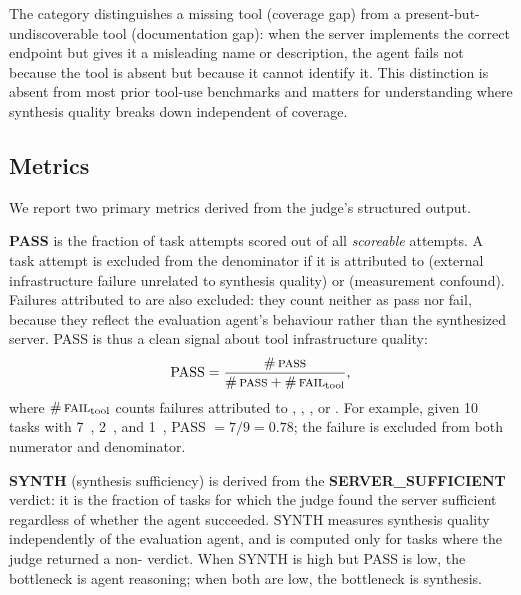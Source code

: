 \noindent
The  category distinguishes a missing tool (coverage gap) from a present-but-undiscoverable tool (documentation gap): when the server implements the correct endpoint but gives it a misleading name or description, the agent fails not because the tool is absent but because it cannot identify it. This distinction is absent from most prior tool-use benchmarks and matters for understanding where synthesis quality breaks down independent of coverage.

\subsection{Metrics}
\label{sec:metrics}

We report two primary metrics derived from the judge's structured output.

\textbf{PASS} is the fraction of task attempts scored  out of all \emph{scoreable} attempts. A task attempt is excluded from the denominator if it is attributed to  (external infrastructure failure unrelated to synthesis quality) or  (measurement
confound). Failures attributed to  are also excluded:
they count neither as pass nor fail, because they reflect the evaluation agent's behaviour rather than the synthesized server. PASS is thus a clean signal about tool infrastructure quality:
%
\begin{equation}
  \text{PASS}
  = \frac{\#\,\textsc{pass}}
    {\#\,\textsc{pass} + \#\,\textsc{fail}_{\text{tool}}},
  \label{eq:pass}
\end{equation}
%
where $\#\,\textsc{fail}_{\text{tool}}$ counts failures attributed to
, ,
, or .
For example, given 10 tasks with 7~, 2~,
and 1~, PASS $= 7/9 = 0.78$; the
 failure is excluded from both numerator and
denominator.

\textbf{SYNTH} (synthesis sufficiency) is derived from the \textbf{SERVER\_SUFFICIENT} verdict: it is the fraction of tasks for which the judge found the server sufficient regardless of whether the agent succeeded. SYNTH measures synthesis quality independently of the evaluation
agent, and is computed only for tasks where the judge returned a non- verdict. When SYNTH is high but PASS is low, the bottleneck is agent reasoning; when both are low, the bottleneck is synthesis.

